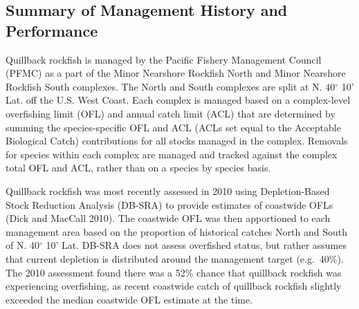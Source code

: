 \documentclass[11pt,
  english,
  a4paper,
]{article}
\begin{document}
\leavevmode\tagmcend\tagstructend\par


\hypertarget{summary-of-management-history-and-performance}{%
\subsection{Summary of Management History and Performance}\label{summary-of-management-history-and-performance}}

\leavevmode\tagmcend\tagstructend


Quillback rockfish is managed by the Pacific Fishery Management Council (PFMC) as a part of the Minor Nearshore Rockfish North and Minor Nearshore Rockfish South complexes. The North and South complexes are split at N. 40{\(^\circ\)\leavevmode\tagmcend\tagstructend} 10' Lat. off the U.S. West Coast. Each complex is managed based on a complex-level overfishing limit (OFL) and annual catch limit (ACL) that are determined by summing the species-specific OFL and ACL (ACLs set equal to the Acceptable Biological Catch) contributions for all stocks managed in the complex. Removals for species within each complex are managed and tracked against the complex total OFL and ACL, rather than on a species by species basis.

\leavevmode\tagmcend\tagstructend\par


Quillback rockfish was most recently assessed in 2010 using Depletion-Based Stock Reduction Analysis (DB-SRA) to provide estimates of coastwide OFLs {(Dick and MacCall 2010)\leavevmode\tagmcend\tagstructend}. The coastwide OFL was then apportioned to each management area based on the proportion of historical catches North and South of N. 40{\(^\circ\)\leavevmode\tagmcend\tagstructend} 10' Lat. DB-SRA does not assess overfished status, but rather assumes that current depletion is distributed around the management target (e.g.~40\%). The 2010 assessment found there was a 52\% chance that quillback rockfish was experiencing overfishing, as recent coastwide catch of quillback rockfish slightly exceeded the median coastwide OFL estimate at the time.
\end{document}
